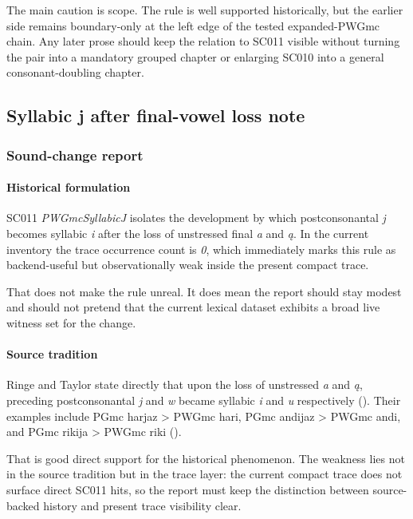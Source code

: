 \documentclass[
  british,
  a4paper,
]{article}
\begin{document}
The main caution is scope. The rule is well supported historically, but
the earlier side remains boundary-only at the left edge of the tested
expanded-PWGmc chain. Any later prose should keep the relation to SC011
visible without turning the pair into a mandatory grouped chapter or
enlarging SC010 into a general consonant-doubling chapter.

\subsection{Syllabic j after final-vowel loss
note}\label{syllabic-j-after-final-vowel-loss-note}

\subsubsection{Sound-change report}\label{sound-change-report-8}

\paragraph{Historical formulation}\label{historical-formulation-8}

SC011 \emph{PWGmcSyllabicJ} isolates the development by which
postconsonantal \emph{j} becomes syllabic \emph{i} after the loss of
unstressed final \emph{a} and \emph{ą}. In the current inventory the
trace occurrence count is \emph{0}, which immediately marks this rule as
backend-useful but observationally weak inside the present compact
trace.

That does not make the rule unreal. It does mean the report should stay
modest and should not pretend that the current lexical dataset exhibits
a broad live witness set for the change.

\paragraph{Source tradition}\label{source-tradition-8}

Ringe and Taylor state directly that upon the loss of unstressed
\emph{a} and \emph{ą}, preceding postconsonantal \emph{j} and \emph{w}
became syllabic \emph{i} and \emph{u} respectively
(). Their
examples include PGmc harjaz \textgreater{} PWGmc hari, PGmc andijaz
\textgreater{} PWGmc andi, and PGmc rikija \textgreater{} PWGmc riki
().

That is good direct support for the historical phenomenon. The weakness
lies not in the source tradition but in the trace layer: the current
compact trace does not surface direct SC011 hits, so the report must
keep the distinction between source-backed history and present trace
visibility clear.
\end{document}
